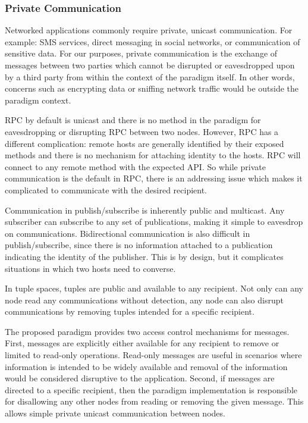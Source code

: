 \documentclass[lnicst]{svmultln}
\begin{document}
\subsubsection{Private Communication}

    Networked applications commonly require private, unicast communication. For example: SMS services, direct messaging in social networks, or communication of sensitive data. For our purposes, private communication is the exchange of messages between two parties which cannot be disrupted or eavesdropped upon by a third party from within the context of the paradigm itself. In other words, concerns such as encrypting data or sniffing network traffic would be outside the paradigm context.

    RPC by default is unicast and there is no method in the paradigm for eavesdropping or disrupting RPC between two nodes. However, RPC has a different complication: remote hosts are generally identified by their exposed methods and there is no mechanism for attaching identity to the hosts. RPC will connect to any remote method with the expected API. So while private communication is the default in RPC, there is an addressing issue which makes it complicated to communicate with the desired recipient.

Communication in publish/subscribe is inherently public and multicast. Any subscriber can subscribe to any set of publications, making it simple to eavesdrop on communications. Bidirectional communication is also difficult in publish/subscribe, since there is no information attached to a publication indicating the identity of the publisher. This is by design, but it complicates situations in which two hosts need to converse.

In tuple spaces, tuples are public and available to any recipient. Not only can any node read any communications without detection, any node can also disrupt communications by removing tuples intended for a specific recipient.

The proposed paradigm provides two access control mechanisms for messages. First, messages are explicitly either available for any recipient to remove or limited to read-only operations. Read-only messages are useful in scenarios where information is intended to be widely available and removal of the information would be considered disruptive to the application. Second, if messages are directed to a specific recipient, then the paradigm implementation is responsible for disallowing any other nodes from reading or removing the given message. This allows simple private unicast communication between nodes.
\end{document}
